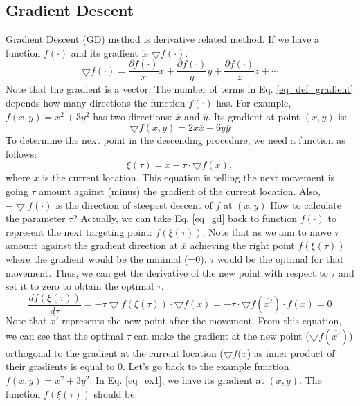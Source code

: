 \documentclass{llncs}
\begin{document}
\subsection{Gradient Descent}
Gradient Descent (GD) method is derivative related method. If we have a function $f(\cdot)$ and its gradient is $\bigtriangledown f(\cdot)$. 
\begin{equation}
    \label{eq_def_gradient}
    \bigtriangledown f(\cdot) = \frac{\partial f(\cdot)}{x}\overline{x} + \frac{\partial f(\cdot)}{y}\overline{y} + \frac{\partial f(\cdot)}{z}\overline{z} + \cdots
\end{equation}
Note that the gradient is a vector. The number of terms in Eq. \eqref{eq_def_gradient} depends how many directions the function $f(\cdot)$ has. 
For example, $f(x,y)=x^2+3y^2$ has two directions: $\overline{x}$ and $\overline{y}$. Its gradient at point $(x,y)$ is:
\begin{equation}
    \label{eq_ex1}
    \bigtriangledown f(x,y) =  2x\overline{x} + 6y\overline{y}
\end{equation}
To determine the next point in the descending procedure, we need a function as follows:
\begin{equation}
    \label{eq_gd}
\xi(\tau) = \overline{x} - \tau \cdot \bigtriangledown f(\overline{{x}}),
\end{equation}
where $\overline{x}$ is the current location. This equation is telling the next movement is going $\tau$ amount against (minus) the gradient of the current location. Also, $-\bigtriangledown f(\cdot)$ is the direction of steepest descent of $f$ at $(x,y)$
How to calculate the parameter $\tau$? Actually, we can take Eq. \eqref{eq_gd} back to function $f(\cdot)$ to represent the next targeting point: $f(\xi(\tau))$. Note that as we aim to move $\tau$ amount against the gradient direction at $\overline{x}$ achieving the right point $f(\xi(\tau))$ where the gradient would be the minimal (=0). $\tau$ would be the optimal for that movement. Thus, we can get the derivative of the new point with respect to $\tau$ and set it to zero to obtain the optimal $\tau$.
\begin{equation}
    \frac{d f(\xi(\tau))}{ d \tau} =- \tau \bigtriangledown f(\xi(\tau)) \cdot \bigtriangledown f(\overline{x}) = -\tau \cdot \bigtriangledown f(\overline{x\prime}) \cdot f(\overline{x}) = 0
\end{equation}
Note that $\overline{x\prime}$ represents the new point after the movement. From this equation, we can see that the optimal $\tau$ can make the gradient at the new point ($\bigtriangledown f(\overline{x\prime})$) orthogonal to the gradient at the current location ($\bigtriangledown f(\overline{x}$) as inner product of their gradients is equal to 0. Let's go back to the example function $f(x,y)=x^2+3y^2$. In Eq. \eqref{eq_ex1}, we have its gradient at $(x,y)$. The function $f(\xi(\tau))$ should be:
\end{document}
